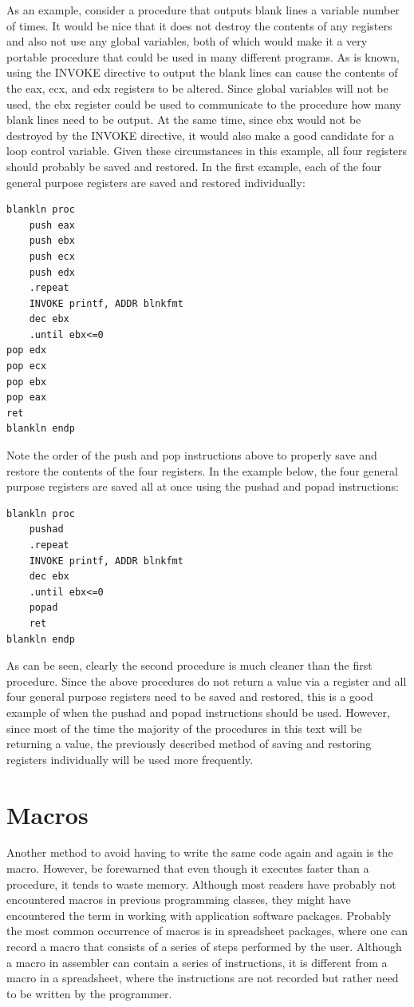 \documentclass[10pt]{book}
\begin{document}
As an example, consider a procedure that outputs blank lines a variable number of times. It would be nice that it does not destroy the contents of any registers and also not use any global variables, both of which would make it a very portable procedure that could be used in many different programs. As is known, using the INVOKE directive to output the blank lines can cause the contents of the eax, ecx, and edx registers to be altered. Since global variables will not be used, the ebx register could be used to communicate to the procedure how many blank lines need to be output. At the same time, since ebx would not be destroyed by the INVOKE directive, it would also make a good candidate for a loop control variable. Given these circumstances in this example, all four registers should probably be saved and restored. In the first example, each of the four general purpose registers are saved and restored individually:
\begin{verbatim}
blankln proc
    push eax
    push ebx
    push ecx
    push edx
    .repeat
    INVOKE printf, ADDR blnkfmt
    dec ebx
    .until ebx<=0
pop edx
pop ecx
pop ebx
pop eax
ret
blankln endp
\end{verbatim}

Note the order of the push and pop instructions above to properly save and restore the contents of the four registers. In the example below, the four general purpose registers are saved all at once using the pushad and popad instructions:

\begin{verbatim}
blankln proc
    pushad
    .repeat
    INVOKE printf, ADDR blnkfmt
    dec ebx
    .until ebx<=0
    popad
    ret
blankln endp
\end{verbatim}

As can be seen, clearly the second procedure is much cleaner than the first procedure. Since the above procedures do not return a value via a register and all four general purpose registers need to be saved and restored, this is a good example of when the pushad and popad instructions should be used. However, since most of the time the majority of the procedures in this text will be returning a value, the previously described method of saving and restoring registers individually will be used more frequently.

\section{Macros}
Another method to avoid having to write the same code again and again is the macro. However, be forewarned that even though it executes faster than a procedure, it tends to waste memory. Although most readers have probably not encountered macros in previous programming classes, they might have encountered the term in working with application software packages. Probably the most common occurrence of macros is in spreadsheet packages, where one can record a macro that consists of a series of steps performed by the user. Although a macro in assembler can contain a series of instructions, it is different from a macro in a spreadsheet, where the instructions are not recorded but rather need to be written by the programmer.
\end{document}
